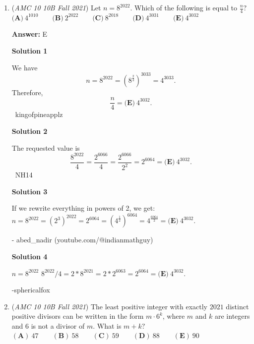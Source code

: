 \begin{enumerate}
 It follows that 
 \[|N-8|=2.\]We continue with the casework in Solution 1 to get the answer $\boxed{\textbf{(C)} \: 60}.$




\textbf{Solution 3}

Let the temperature in Minneapolis be $N$. Then St. Louis is $0$ degrees. $N - 5 = 3 \pm 2$, $N = -10, -6$, $-10 \cdot -6 = \boxed{\textbf{(C)} \: 60}$.

 


	\item (\textit{AMC 10 10B Fall 2021}) Let $n=8^{2022}$. Which of the following is equal to $\frac{n}{4}?$
$\textbf{(A)}\: 4^{1010}\qquad\textbf{(B)} \: 2^{2022}\qquad\textbf{(C)} \: 8^{2018}\qquad\textbf{(D)} \: 4^{3031}\qquad\textbf{(E)} \: 4^{3032}$

 \textbf{Answer: }E



\textbf{Solution 1}

We have 
 \[n=8^{2022}=  \left(8^\frac{2}{3}\right)^{3033}=4^{3033}.\]Therefore, 
 \[\frac{n}4=\boxed{\textbf{(E)} \: 4^{3032}}.\]~kingofpineapplz

 



\textbf{Solution 2}

The requested value is 
 \[\frac{8^{2022}}{4} = \frac{2^{6066}}{4} = \frac{2^{6066}}{2^2} = 2^{6064} = \boxed{\textbf{(E)} \: 4^{3032}}.\]~NH14

 



\textbf{Solution 3}

If we rewrite everything in powers of 2, we get:$n = 8^{2022} = (2^{3})^{2022} = 2^{6064} = (4^{\frac{1}{2}})^{6064} = 4^{\frac{6064}{2}} = \boxed{\textbf{(E)} \: 4^{3032}}.$

 - abed\_nadir (youtube.com/@indianmathguy)

 



\textbf{Solution 4}

$n = 8^{2022}$
${8^{2022}}/{4} = 2 * 8^{2021} = 2 * 2^{6063} = 2^{6064} = \boxed{\textbf{(E)} \: 4^{3032}}.$

 -sphericalfox

 


	\item (\textit{AMC 10 10B Fall 2021}) The least positive integer with exactly $2021$ distinct positive divisors can be written in the form $m \cdot 6^k$, where $m$ and $k$ are integers and $6$ is not a divisor of $m$. What is $m+k?$
$(\textbf{A})\: 47\qquad(\textbf{B}) \: 58\qquad(\textbf{C}) \: 59\qquad(\textbf{D}) \: 88\qquad(\textbf{E}) \: 90$


\end{enumerate}
